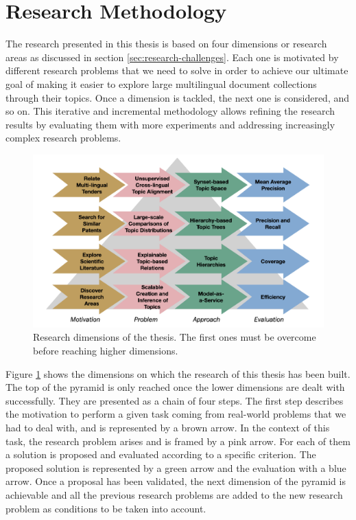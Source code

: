 \section{Research Methodology}\label{sec:research-methodology}

The research presented in this thesis is based on four dimensions or research areas as discussed in section \ref{sec:research-challenges}. Each one is motivated by different research problems that we need to solve in order to achieve our ultimate goal of making it easier to explore large multilingual document collections through their topics. Once a dimension is tackled, the next one is considered, and so on. This iterative and incremental methodology allows  refining the research results by evaluating them with more experiments and addressing increasingly complex research problems.

\begin{figure}[!htbp]
\centering
\includegraphics[scale=0.24]{dimensions.png}
\caption{Research dimensions of the thesis. The first ones must be overcome before reaching higher dimensions. }
\label{fig:dimensions}
\end{figure}

Figure \ref{fig:dimensions} shows the dimensions on which the research of this thesis has been built. The top of the pyramid is only reached once the lower dimensions are dealt with successfully. They are presented as a chain of four steps. The first step describes the motivation to perform a given task coming from real-world problems that we had to deal with, and is represented by a brown arrow. In the context of this task, the research problem arises and is framed by a pink arrow. For each of them a solution is proposed and evaluated according to a specific criterion. The proposed solution is represented by a green arrow and the evaluation with a blue arrow. Once a proposal has been validated, the next dimension of the pyramid is achievable and all the previous research problems are added to the new research problem as conditions to be taken into account.

